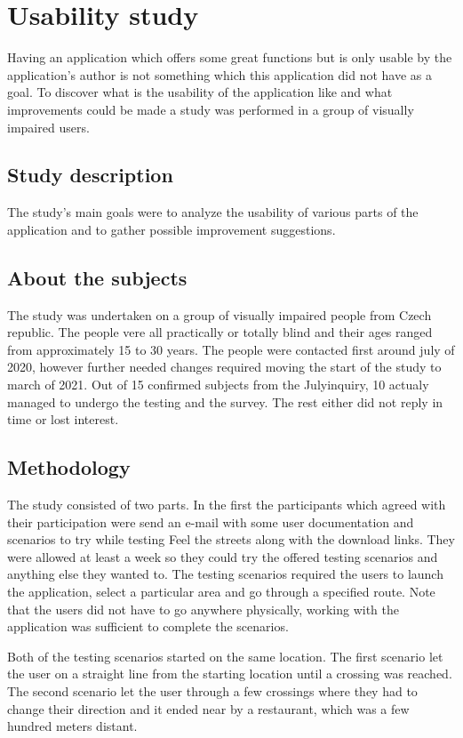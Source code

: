 \documentclass[nolof,digital]{fithesis3}
\begin{document}
\chapter{Usability study}
Having an application which offers some great functions but is only usable by the application's author is not something which this application did not have as a goal. To discover what is the usability of the application like and what improvements could be made a study was performed in a group of visually impaired users.
\section{Study description}
The study's main goals were to analyze the usability of various parts of the application and to gather possible improvement suggestions.
\section{About the subjects}
The study was undertaken on a group of visually impaired people from Czech republic. The people vere all practically or totally blind and their ages ranged from approximately 15 to 30 years. The people were contacted first around july of 2020, however further needed changes required moving the start of the study to march of 2021. Out of 15 confirmed subjects from the Julyinquiry, 10 actualy managed to undergo the testing and the survey. The rest either did not reply in time or lost interest.
\section{Methodology}
The study consisted of two parts. In the first the participants which agreed with their participation were send an e-mail with some user documentation and scenarios to try while testing Feel the streets along with the download links. They were allowed at least a week so they could try the offered testing scenarios and anything else they wanted to. The testing scenarios required the users to launch the application, select a particular area and go through a specified route. Note that the users did not have to go anywhere physically, working with the application was sufficient to complete the scenarios.

Both of the testing scenarios started on the same location. The first scenario let the user on a straight line from the starting location until a crossing was reached. The second scenario let the user through a few crossings where they had to change their direction and it ended near by a restaurant, which was a few hundred meters distant.
\end{document}
